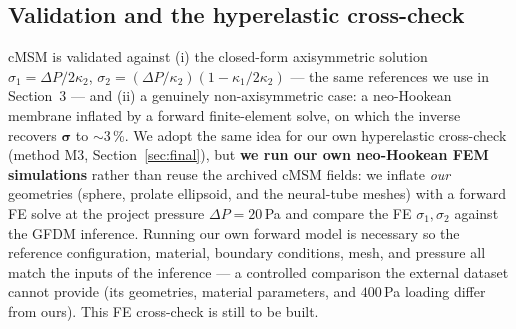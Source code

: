 \documentclass[11pt]{article}
\begin{document}
\subsection{Validation and the hyperelastic cross-check}
cMSM is validated against (i) the closed-form axisymmetric solution
$\sigma_1=\Delta P/2\kappa_2$, $\sigma_2=(\Delta P/\kappa_2)(1-\kappa_1/2\kappa_2)$ --- the
same references we use in Section~3 --- and (ii) a genuinely non-axisymmetric case: a
neo-Hookean membrane inflated by a forward finite-element solve, on which the inverse recovers
$\bm\sigma$ to $\sim$3\,\%. We adopt the same idea for our own hyperelastic cross-check
(method M3, Section~\ref{sec:final}), but \textbf{we run our own neo-Hookean FEM
simulations} rather than reuse the archived cMSM fields: we inflate \emph{our} geometries
(sphere, prolate ellipsoid, and the neural-tube meshes) with a forward FE solve at the project
pressure $\Delta P=20$\,Pa and compare the FE $\sigma_1,\sigma_2$ against the GFDM inference.
Running our own forward model is necessary so the reference configuration, material, boundary
conditions, mesh, and pressure all match the inputs of the inference --- a controlled
comparison the external dataset cannot provide (its geometries, material parameters, and
$400$\,Pa loading differ from ours). This FE cross-check is still to be built.
\end{document}
